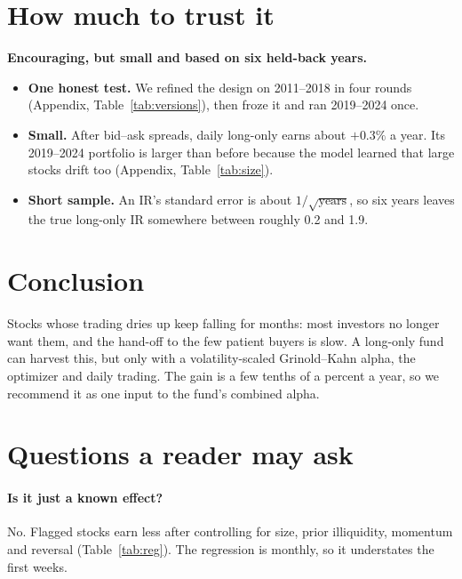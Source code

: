 \documentclass[11pt]{article}
\newcommand{\takeaway}[1]{\noindent\textbf{#1}\par\smallskip}
\begin{document}
\section{How much to trust it}
\takeaway{Encouraging, but small and based on six held-back years.}

\begin{itemize}
  \item \textbf{One honest test.} We refined the design on 2011--2018 in four rounds (Appendix, Table~\ref{tab:versions}),
        then froze it and ran 2019--2024 once.
  \item \textbf{Small.} After bid--ask spreads, daily long-only earns about $+0.3\%$ a year. Its 2019--2024 portfolio is
        larger than before because the model learned that large stocks drift too (Appendix, Table~\ref{tab:size}).
  \item \textbf{Short sample.} An IR's standard error is about $1/\sqrt{\text{years}}$, so six years leaves the true
        long-only IR somewhere between roughly 0.2 and 1.9.
\end{itemize}

\section{Conclusion}
Stocks whose trading dries up keep falling for months: most investors no longer want them, and the hand-off to the few patient buyers is slow. A long-only fund can harvest
this, but only with a volatility-scaled Grinold--Kahn alpha, the optimizer and daily trading. The gain is a few tenths
of a percent a year, so we recommend it as one input to the fund's combined alpha.

\appendix
\section{Questions a reader may ask}

\paragraph{Is it just a known effect?} No. Flagged stocks earn less after controlling for size, prior illiquidity,
momentum and reversal (Table~\ref{tab:reg}). The regression is monthly, so it understates the first weeks.
\begin{table}[H]
\centering
\caption{Monthly regressions of next month's specific return, 2008--2018; positive = flagged stocks earn less.
Measured monthly, so it understates the first-weeks effect.}\label{tab:reg}

\end{table}
\end{document}
